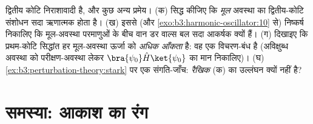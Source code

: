\begin{exercise}[$\star\star\star$]\label{exo:b3:perturbation-theory:12}
द्वितीय कोटि निराशावादी है, और कुछ अन्य प्रमेय। (क) सिद्ध कीजिए कि
\emph{मूल} अवस्था का द्वितीय-कोटि संशोधन सदा
ऋणात्मक होता है। (ख) इससे (और
\cref{exo:b3:harmonic-oscillator:10} से) निष्कर्ष निकालिए कि
मूल-अवस्था परमाणुओं के बीच वान डर वाल्स बल सदा आकर्षक क्यों हैं। (ग)
दिखाइए कि प्रथम-कोटि सिद्धांत हर मूल-अवस्था ऊर्जा को
\emph{अधिक आँकता} है: वह एक विचरण-बंध है (अविक्षुब्ध अवस्था को
परीक्षण-अवस्था लेकर $\bra{\psi_0}\hat
H\ket{\psi_0}$ का मान निकालिए)। (घ)
\cref{ex:b3:perturbation-theory:stark} पर एक संगति-जाँच:
\emph{रैखिक}  (क) का उल्लंघन क्यों नहीं है?
\end{exercise}

\section{समस्या: आकाश का रंग}

